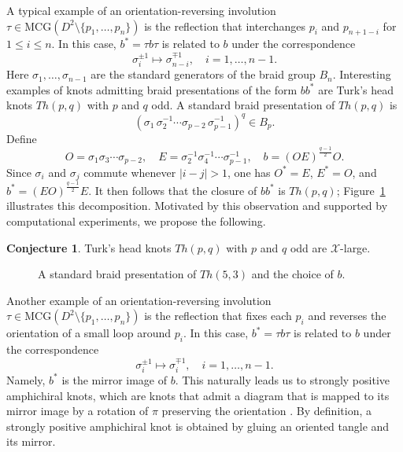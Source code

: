 \documentclass[12pt,reqno]{amsart}
\theoremstyle{definition}
\newtheorem{conjecture}[theorem]{Conjecture}
\def\calX{\mathcal X}
\begin{document}
A typical example of an orientation-reversing involution $\tau\in \mathrm{MCG}(D^2 \setminus \{p_1,\dotsc,p_n\})$ is the reflection that interchanges $p_i$ and $p_{n+1-i}$ for $1 \leq i \leq n$. In this case, $b^\ast = \tau b \tau$ is related to $b$ under the correspondence
$$\sigma_{i}^{\pm 1} \longmapsto \sigma_{n-i}^{\mp 1},\quad i=1,\ldots,n-1.$$
Here $\sigma_1,\ldots,\sigma_{n-1}$ are the standard generators of the braid group $B_n$.
Interesting examples of knots  admitting braid presentations of the form $bb^\ast$ are  
Turk's head knots $Th(p,q)$ with $p$ and $q$ odd. A standard braid presentation of $Th(p,q)$ is 
\begin{equation*}
    \left(\sigma_1 \, \sigma_2^{-1} \cdots \sigma_{p-2} \,\sigma_{p-1}^{-1} \right)^{q} \in B_p.
\end{equation*}
Define
\begin{equation*}
    O = \sigma_1 \sigma_3 \cdots \sigma_{p-2}, \quad 
    E = \sigma_2^{-1} \sigma_4^{-1} \cdots \sigma_{p-1}^{-1}, \quad
    b =(OE)^{\frac{q-1}{2}}O.
\end{equation*}
Since $\sigma_i$ and $\sigma_j$ commute whenever $|i-j|>1$, one has $O^\ast = E$, $E^\ast = O$, and $b^\ast = (EO)^{\frac{q-1}{2}}E$. It then follows that the closure of $bb^\ast$ is $Th(p,q)$;
Figure~\ref{fig.turk} illustrates this decomposition.
Motivated by this observation and supported by computational experiments, we propose the following.
\begin{conjecture}
\label{conj.turk}
    Turk's head knots $Th(p,q)$ with $p$ and $q$ odd are $\calX$-large.
\end{conjecture}
\begin{figure}[!htbp]
    \centering
     \scalebox{1}{}
    \caption{A standard braid presentation of $Th(5,3)$ and the choice of $b$.}
    \label{fig.turk}
\end{figure}


Another example of an orientation-reversing involution $\tau\in \mathrm{MCG}(D^2 \setminus \{p_1,\dotsc,p_n\})$ is the reflection that fixes each $p_i$ and reverses the orientation of a small loop around $p_i$. In this case, $b^\ast = \tau b \tau$ is related to $b$ under the correspondence
$$\sigma_{i}^{\pm 1} \longmapsto \sigma_{i}^{\mp 1},\quad i=1,\ldots,n-1.$$
Namely, $b^\ast$ is the mirror image of $b$. This naturally leads us to strongly positive amphichiral knots, which are knots that admit a diagram that is mapped to
its mirror image by a rotation of $\pi$ preserving the orientation \cite{lamm2023strongly}. By definition, a strongly positive amphichiral knot is obtained by gluing an oriented tangle and its mirror. 
\end{document}
